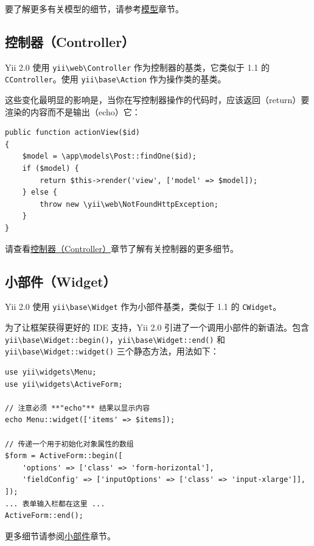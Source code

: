 要了解更多有关模型的细节，请参考\hyperref[structure-models.md]{模型}章节。

\subsection{控制器（Controller）}
Yii 2.0 使用 \texttt{yii{\allowbreak{}\textbackslash}web{\allowbreak{}\textbackslash}Controller} 作为控制器的基类，它类似于 1.1 的 \lstinline|CController|。使用 \texttt{yii{\allowbreak{}\textbackslash}base{\allowbreak{}\textbackslash}Action} 作为操作类的基类。

这些变化最明显的影响是，当你在写控制器操作的代码时，应该返回（return）要渲染的内容而不是输出（echo）它：

\lstset{language=php}\begin{lstlisting}
public function actionView($id)
{
    $model = \app\models\Post::findOne($id);
    if ($model) {
        return $this->render('view', ['model' => $model]);
    } else {
        throw new \yii\web\NotFoundHttpException;
    }
}
\end{lstlisting}
请查看\hyperref[structure-controllers.md]{控制器（Controller）}章节了解有关控制器的更多细节。

\subsection{小部件（Widget）}
Yii 2.0 使用 \texttt{yii{\allowbreak{}\textbackslash}base{\allowbreak{}\textbackslash}Widget} 作为小部件基类，类似于 1.1 的 \lstinline|CWidget|。

为了让框架获得更好的 IDE 支持，Yii 2.0 引进了一个调用小部件的新语法。包含 \texttt{yii{\allowbreak{}\textbackslash}base{\allowbreak{}\textbackslash}Widget\allowbreak{}::\allowbreak{}begin()}，\texttt{yii{\allowbreak{}\textbackslash}base{\allowbreak{}\textbackslash}Widget\allowbreak{}::\allowbreak{}end()} 和 \texttt{yii{\allowbreak{}\textbackslash}base{\allowbreak{}\textbackslash}Widget\allowbreak{}::\allowbreak{}widget()} 三个静态方法，用法如下：

\lstset{language=php}\begin{lstlisting}
use yii\widgets\Menu;
use yii\widgets\ActiveForm;

// 注意必须 **"echo"** 结果以显示内容
echo Menu::widget(['items' => $items]);

// 传递一个用于初始化对象属性的数组
$form = ActiveForm::begin([
    'options' => ['class' => 'form-horizontal'],
    'fieldConfig' => ['inputOptions' => ['class' => 'input-xlarge']],
]);
... 表单输入栏都在这里 ...
ActiveForm::end();
\end{lstlisting}
更多细节请参阅\hyperref[structure-widgets.md]{小部件}章节。

